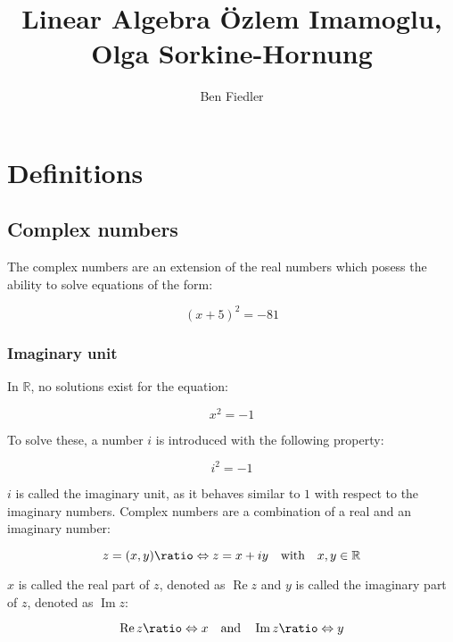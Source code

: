 \documentclass[a4paper,12pt]{article}
\newcommand{\uniti}{i}
\newcommand{\defas}{\ratio\Leftrightarrow}
\renewcommand{\Re}[1]{\operatorname{Re}{#1}}
\renewcommand{\Im}[1]{\operatorname{Im}{#1}}
\theoremstyle{definition}
\begin{document}
\author{Ben Fiedler}
\title{Linear Algebra \vspace{.5cm}
       \large{Özlem Imamoglu, Olga Sorkine-Hornung}}
\date{ }

\maketitle
\tableofcontents

\newpage

\section{Definitions}

\subsection{Complex numbers}

The complex numbers are an extension of the real numbers which posess the ability to
solve equations of the form:

$$ (x + 5) ^ 2 = -81 $$

\subsubsection{Imaginary unit}

In $\mathbb{R}$, no solutions exist for the equation:

\begin{equation}
    x^2 = {-1}
\end{equation}

To solve these, a number $\uniti$ is introduced with the following property:

\begin{equation}
    \uniti^2 = {-1}
\end{equation}

$\uniti$ is called the imaginary unit, as it behaves similar to $1$ with respect to
the imaginary numbers. Complex numbers are a combination of a real and an imaginary number:

\begin{equation}
    z = (x, y) \defas z = x + \uniti y \quad \text{with} \quad x, y \in \mathbb{R}
\end{equation}

$x$ is called the real part of $z$, denoted as $\Re{z}$ and $y$ is called the
imaginary part of $z$, denoted as $\Im{z}$:

$$ \Re{z} \defas x \quad \text{and} \quad \Im{z} \defas y $$
\end{document}
